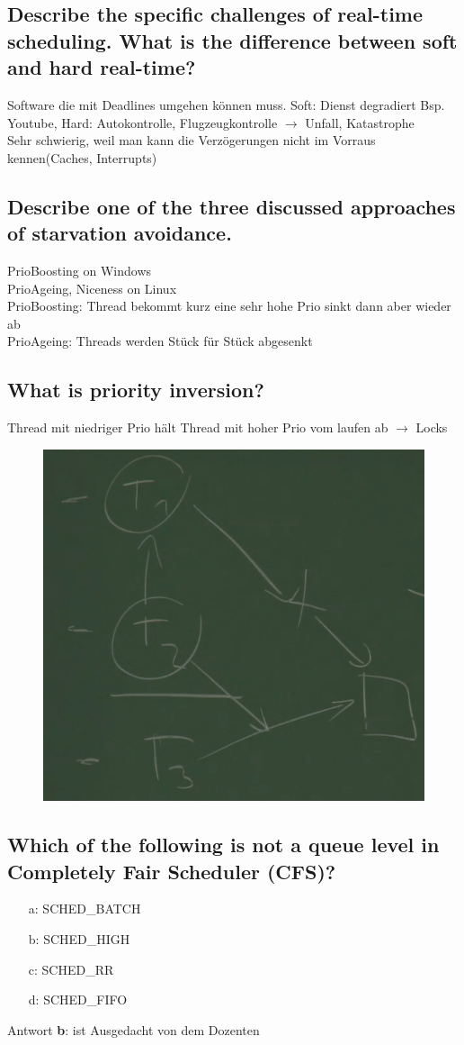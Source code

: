 \subsection{Describe the specific challenges of real-time scheduling. What is the difference between soft and hard real-time?}
Software die mit Deadlines umgehen k\"onnen muss. Soft: Dienst degradiert Bsp. Youtube, Hard: Autokontrolle, Flugzeugkontrolle $\rightarrow$ Unfall, Katastrophe\\
Sehr schwierig, weil man kann die Verz\"ogerungen nicht im Vorraus kennen(Caches, Interrupts)

\subsection{Describe one of the three discussed approaches of starvation avoidance.}
PrioBoosting on Windows\\PrioAgeing, Niceness on Linux\\
PrioBoosting: Thread bekommt kurz eine sehr hohe Prio sinkt dann aber wieder ab\\
PrioAgeing: Threads werden St\"uck f\"ur St\"uck abgesenkt

\subsection{What is priority inversion?}
Thread mit niedriger Prio h\"alt Thread mit hoher Prio vom laufen ab $\rightarrow$ Locks\\

\begin{figure}[H]
	\centering
	\includegraphics[width=0.5\linewidth]{Pictures/priority_inversion}
\end{figure}

\subsection{Which of the following is not a queue level in Completely Fair Scheduler (CFS)?}
\begin{itemize}
	\setlength\itemsep{-0.5em}
	\item[a:] SCHED\_BATCH
	\item[b:] SCHED\_HIGH
	\item[c:] SCHED\_RR
	\item[d:] SCHED\_FIFO
\end{itemize}
Antwort \textbf{b}: ist Ausgedacht von dem Dozenten

